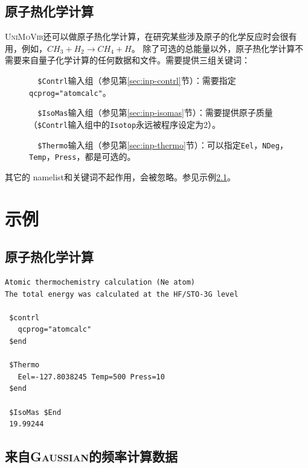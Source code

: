 \documentclass[12pt,a4paper,openany,twoside,cap]{ctexbook}
\begin{document}
\section{原子热化学计算} \label{sec:inp-atom}

\textsc{UniMoVib}还可以做原子热化学计算，在研究某些涉及原子的化学反应时会很有用，例如，$CH_3 + H_2 \rightarrow CH_4 + H$。
除了可选的总能量以外，原子热化学计算不需要来自量子化学计算的任何数据和文件。需要提供三组关键词：

\begin{description}
\item[ ]\verb|  $Contrl|输入组（参见第\ref{sec:inp-contrl}节）：需要指定\verb|qcprog="atomcalc"|。
\item[ ]\verb|  $IsoMas|输入组（参见第\ref{sec:inp-isomas}节）：需要提供原子质量（\verb|$Contrl|输入组中的\verb|Isotop|永远被程序设定为2）。
\item[ ]\verb|  $Thermo|输入组（参见第\ref{sec:inp-thermo}节）：可以指定\verb|Eel|，\verb|NDeg|，\verb|Temp|，\verb|Press|，都是可选的。
\end{description}
其它的 namelist和关键词不起作用，会被忽略。参见示例\ref{sec:exp1}。

\chapter{示例} \label{part:examp}

\section{原子热化学计算} \label{sec:exp1}

\begin{colorboxed}[oval=false,boxcolor=green!75!black,bgcolor=green!5!white]
\ttfamily\footnotesize
\begin{lstlisting}
Atomic thermochemistry calculation (Ne atom)
The total energy was calculated at the HF/STO-3G level

 $contrl
   qcprog="atomcalc"
 $end

 $Thermo
   Eel=-127.8038245 Temp=500 Press=10
 $end

 $IsoMas $End
 19.99244
\end{lstlisting}\end{colorboxed}

\section{来自\textsc{Gaussian}的频率计算数据} \label{sec:exp2}
\end{document}
